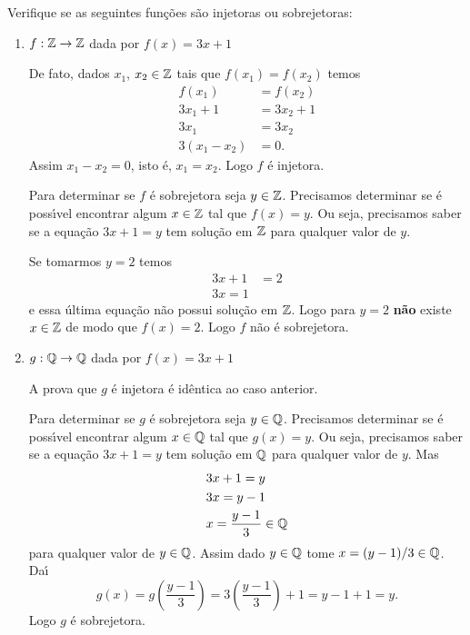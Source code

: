 \begin{exemplos}
	Verifique se as seguintes fun\c{c}\~oes s\~ao injetoras ou sobrejetoras:
	\begin{enumerate}[label={\arabic*})]
		\item $f : \mathbb{Z} \to \mathbb{Z}$ dada por $f(x) = 3x + 1$
		\begin{solucao}
			De fato, dados $x_1$, $x_2 \in \mathbb{Z}$ tais que $f(x_1) = f(x_2)$ temos
			\begin{align*}
				f(x_1) &= f(x_2)\\
				3x_1 + 1 &= 3x_2 + 1\\
				3x_1 &= 3x_2\\
				3(x_1 - x_2) &= 0.
			\end{align*}
			Assim $x_1 - x_2 = 0$, isto \'e, $x_1 = x_2$. Logo $f$ \'e injetora.

			Para determinar se $f$ \'e sobrejetora seja $y \in \mathbb{Z}$. Precisamos determinar se \'e poss{\'\i}vel encontrar algum $x \in \mathbb{Z}$ tal que $f(x) = y$. Ou seja, precisamos saber se a equa\c{c}\~ao $3x + 1 = y$ tem solu\c{c}\~ao em $\mathbb{Z}$ para qualquer valor de $y$.

			Se tomarmos $y = 2$ temos
			\begin{align*}
				3x + 1 &= 2\\
				3x = 1
			\end{align*}
			e essa \'ultima equa\c{c}\~ao n\~ao possui solu\c{c}\~ao em $\mathbb{Z}$. Logo para $y = 2$ \textbf{n\~ao} existe $x \in \mathbb{Z}$ de modo que $f(x) = 2$. Logo $f$ n\~ao \'e sobrejetora.
		\end{solucao}

		\item $g : \mathbb{Q} \to \mathbb{Q}$ dada por $f(x) = 3x + 1$
		\begin{solucao}
			A prova que $g$ \'e injetora \'e id\^entica ao caso anterior.

			Para determinar se $g$ \'e sobrejetora seja $y \in \mathbb{Q}$. Precisamos determinar se \'e poss{\'\i}vel encontrar algum $x \in \mathbb{Q}$ tal que $g(x) = y$. Ou seja, precisamos saber se a equa\c{c}\~ao $3x + 1 = y$ tem solu\c{c}\~ao em $\mathbb{Q}$ para qualquer valor de $y$. Mas
			\begin{align*}
				&3x + 1 = y\\
				&3x = y - 1\\
				&x = \dfrac{y - 1}{3} \in \mathbb{Q}
			\end{align*}
			para qualquer valor de $y \in \mathbb{Q}$. Assim dado $y \in \mathbb{Q}$ tome $x = (y - 1)/3 \in \mathbb{Q}$. Da{\'\i}
			\[
				g(x) = g\left(\dfrac{y - 1}{3}\right) = 3\left(\dfrac{y - 1}{3}\right) + 1 = y - 1 + 1 = y. 
			\]
			Logo $g$ \'e sobrejetora.
		\end{solucao}
		

\end{enumerate}
\end{exemplos}
